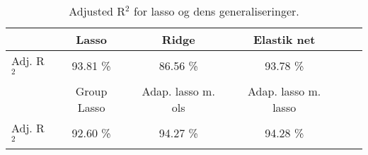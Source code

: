 \begin{table}
\center
\begin{tabular}{lccccc}
\toprule
& Lasso & Ridge & Elastik net \\ \midrule
Adj. R$^2$ & 93.81 \%  & 86.56 \% & 93.78 \%  \\ \bottomrule \toprule 
& Group Lasso & Adap. lasso m. ols & Adap. lasso m. lasso  \\ \midrule
Adj. R$^2$ & 92.60 \% & 94.27 \%  & 94.28 \% \\ \bottomrule 
 \end{tabular}
\caption{Adjusted R$^2$ for lasso og dens generaliseringer.} \label{tab:adj_r2_shrinkage_tab}
\end{table}